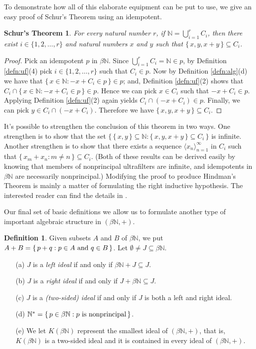\documentclass[12pt]{article}
\theoremstyle{plain}
\newtheorem{schur}[thm]{Schur's Theorem}
\theoremstyle{definition}
\newtheorem{defn}[thm]{Definition}
\newcommand{\bbN}{\mathbb{N}}
\newcommand{\la}{\langle}
\newcommand{\ra}{\rangle}
\begin{document}
To demonstrate how all of this elaborate equipment can be put to use,
we give an easy proof of Schur's Theorem using an idempotent.
\begin{schur}
  For every natural number $r$, if  \/ $\bbN = \bigcup_{i=1}^r C_i$,
  then there exist $i \in \{1, 2, \ldots, r\}$ and natural numbers
  $x$ and $y$ such that $\{\, x, y, x+y \,\} \subseteq C_i$.
\end{schur}
\begin{proof}
  Pick an idempotent $p$ in $\beta\bbN$.
  Since $\bigcup_{i=1}^r C_i = \bbN \in p$, by Definition
  \ref{defn:uf}(4) pick $i \in \{1, 2, \ldots, r\}$ such that $C_i \in
  p$.
  Now by Definition \ref{defn:alg}(d) we have that $\{\, x \in \bbN :
  -x + C_i \in p \,\} \in p$; and, Definition \ref{defn:uf}(2) shows
  that $C_i \cap \{\, x \in \bbN : -x + C_i \in p \,\} \in p$.
  Hence we can pick $x \in C_i$ such that $-x + C_i \in p$. 
  Applying Definition \ref{defn:uf}(2) again yields $C_i \cap (-x +
  C_i) \in p$.
  Finally, we can pick $y \in C_i \cap (-x+C_i)$.
  Therefore we have $\{\, x, y, x+y \,\} \subseteq C_i$.
\end{proof}

It's possible to strengthen the conclusion of this theorem in two
ways.
One strengthen is to show that the set $\bigl\{\,\{\, x, y \,\}
\subseteq \bbN : \{\,x,y,x+y\,\} \subseteq C_i \,\bigr\}$ is infinite.
Another strengthen is to show that there exists a sequence $\la x_n
\ra_{n=1}^\infty$ in $C_i$ such that $\{\, x_m + x_n : m \ne n \,\}
\subseteq C_i$.
(Both of these results can be derived easily by knowing that members
of nonprincipal ultrafilters are infinite, and idempotents in
$\beta\bbN$ are necessarily nonprincipal.)
Modifying the proof to produce Hindman's Theorem is mainly a matter of
formulating the right inductive hypothesis.
The interested reader can find the details in \cite[Theorem
5.8]{Hindman:1998fk}. 

Our final set of basic definitions we allow us to formulate another type
of important algebraic structure in $(\beta\bbN, +)$. 
\begin{defn}
  Given subsets $A$ and $B$ of $\beta\bbN$, we put $A + B = \{\, p+q :
  \hbox{$p \in A$ and $q \in B$} \,\}$.
  Let $\emptyset \ne J \subseteq \beta\bbN$.
  \begin{itemize}
    \item[(a)] $J$ is a \textsl{left ideal} if and only if
      $\beta\bbN + J \subseteq J$.
    \item[(b)] $J$ is a \textsl{right ideal} if and only if
      $J+\beta\bbN \subseteq J$.
    \item[(c)] $J$ is a \textsl{(two-sided) ideal} if and only if
      $J$ is both a left and right ideal.
    \item[(d)] $\bbN^* = \{\, p \in \beta\bbN : \hbox{$p$ is
        nonprincipal} \,\}$.
    \item[(e)] We let $K(\beta\bbN)$ represent the smallest ideal of
      $(\beta\bbN, +)$, that is, $K(\beta\bbN)$ is a two-sided ideal
      and it is contained in every ideal of $(\beta\bbN, +)$.
  \end{itemize}
\end{defn}
\end{document}
